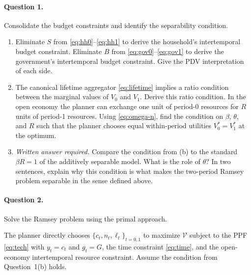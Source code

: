 \paragraph{Question 1.}
Consolidate the budget constraints and identify the separability condition.
 
\begin{enumerate}[label=(\alph*)]
    \item Eliminate $S$ from \eqref{eq:hh0}--\eqref{eq:hh1} to derive the household's intertemporal budget constraint. Eliminate $B$ from \eqref{eq:gov0}--\eqref{eq:gov1} to derive the government's intertemporal budget constraint. Give the PDV interpretation of each side.
 
    \item The canonical lifetime aggregator \eqref{eq:lifetime} implies a ratio condition between the marginal values of $V_0$ and $V_1$. Derive this ratio condition. In the open economy the planner can exchange one unit of period-0 resources for $R$ units of period-1 resources. Using \eqref{eq:omega-n}, find the condition on $\beta$, $\theta$, and $R$ such that the planner chooses equal within-period utilities $V_0^* = V_1^*$ at the optimum.
 
    \item \emph{Written answer required.} Compare the condition from (b) to the standard $\beta R = 1$ of the additively separable model. What is the role of $\theta$? In two sentences, explain why this condition is what makes the two-period Ramsey problem separable in the sense defined above.
\end{enumerate}
 
\paragraph{Question 2.}
Solve the Ramsey problem using the primal approach.
 
The planner directly chooses $\{c_t, n_t, \ell_t\}_{t=0,1}$ to maximize $\mathcal{V}$ subject to the PPF \eqref{eq:tech} with $y_t = c_t$ and $g_t = G$, the time constraint \eqref{eq:time}, and the open-economy intertemporal resource constraint. Assume the condition from Question~1(b) holds.
 
